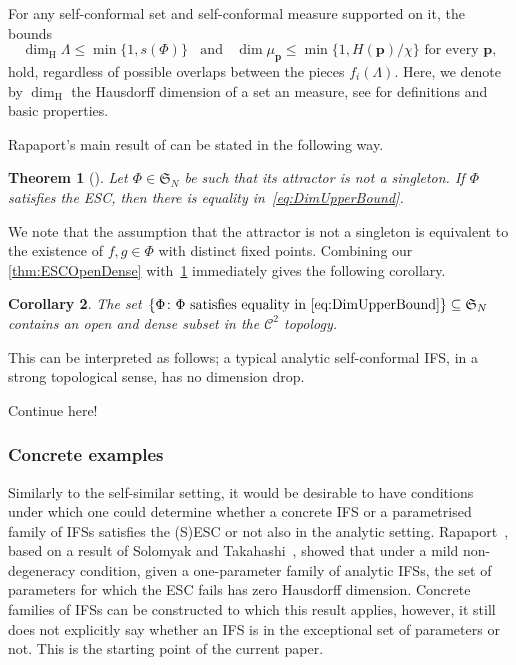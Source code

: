\documentclass[12pt,]{article}
\def\cref#1{\ref{#1}}%
\newtheorem{theorem}{Theorem}[section]
\newtheorem{corollary}[theorem]{Corollary}
\theoremstyle{definition}
\theoremstyle{remark}
\newcommand{\0}{\mathbf{0}}
\begin{document}
{For any self-conformal set and self-conformal measure supported on it, the bounds
\begin{equation}\label{eq:DimUpperBound}
\dim_{\mathrm{H}} \Lambda \leq \min\{1,s(\Phi)\}  \;\;\text{ and }\;\; \dim \mu_{\mathbf{p}} \leq
\min\{1, H(\mathbf{p})/\chi\} \text{ for every } \mathbf{p},
\end{equation} 
hold, regardless of possible overlaps between the pieces $f_i(\Lambda)$.
Here, we denote by $\dim_{\mathrm H}$ the Hausdorff dimension of a set an measure, see
\cite{FalconerBook} for definitions and basic properties.

Rapaport's main result of \cite{Rapaport_SelfConfESC25arXiv}
can be stated in the following way.

\begin{theorem}[\cite{Rapaport_SelfConfESC25arXiv}]\label{thm:RapaportMain}
  Let $\Phi\in\mathfrak{S}_N$ be such that its attractor is not a singleton. If
  $\Phi$ satisfies the ESC, then there is equality in~\cref{eq:DimUpperBound}.
\end{theorem}
We note that the assumption that the attractor is not a singleton is equivalent to the existence of
$f,g\in\Phi$ with distinct fixed points.
Combining our \cref{thm:ESCOpenDense} with~\cref{thm:RapaportMain} immediately gives the following corollary.

\begin{corollary}
  The set $\{\Phi \colon \Phi \text{ satisfies equality in \cref{eq:DimUpperBound}}\}\subseteq
  \mathfrak{S}_N$ contains an open and dense subset in the $\mathcal{C}^2$ topology.
\end{corollary}
This can be interpreted as follows; a typical analytic self-conformal IFS, in a strong topological
sense, has no dimension drop.

{\color{red} Continue here!}

\subsubsection{Concrete examples}\label{sec:examples}
Similarly to the self-similar setting, it would be desirable to have conditions under which one
could determine whether a concrete IFS or a parametrised family of IFSs satisfies the (S)ESC or not
also in the analytic setting. Rapaport~\cite[Corollary 1.4]{Rapaport_SelfConfESC25arXiv}, based on a
result of Solomyak and Takahashi~\cite{SolomyakTakahashi_IMRN21}, showed that under a mild
non-degeneracy condition, given a one-parameter family of analytic IFSs, the set of parameters for
which the ESC fails has zero Hausdorff dimension. Concrete families of IFSs can be constructed to
which this result applies, however, it still does not explicitly say whether an IFS is in the
exceptional set of parameters or not. This is the starting point of the current paper.


}
\end{document}
